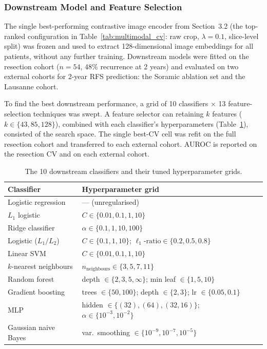 \documentclass[12pt,twoside]{report}
\begin{document}
\subsubsection*{Downstream Model and Feature Selection}
The single best-performing contrastive image encoder from Section~3.2
(the top-ranked configuration in Table~\ref{tab:multimodal_cv}: raw crop, $\lambda=0.1$,
slice-level split) was frozen and used to extract 128-dimensional image embeddings for all
patients, without any further training. Downstream models were fitted on the resection cohort
($n=54$, 48\% recurrence at 2 years) and evaluated on two external
cohorts for 2-year RFS prediction: the Soramic ablation set and the Lausanne cohort.


To find the best downstream performance, a grid of 10 classifiers
$\times$ 13 feature-selection techniques was swept. A feature selector can retaining $k$ features 
($k \in \{43, 85, 128\}$), combined with each classifier's hyperparameters (Table~\ref{tab:classifiere_hyperparameters}),
consisted of the search space. The single best-CV cell was refit on the full resection cohort and transferred to each
external cohort. AUROC is reported on the resection CV and on each external cohort.

\begin{table}[H]
\centering
\small
\caption{The 10 downstream classifiers and their tuned hyperparameter grids.}

\label{tab:classifiere_hyperparameters}
\begin{tabular}{lll}
\hline
Classifier & Hyperparameter grid \\
\hline
Logistic regression      & --- (unregularised) \\
$L_1$ logistic           & $C \in \{0.01, 0.1, 1, 10\}$ \\
Ridge classifier         & $\alpha \in \{0.1, 1, 10, 100\}$ \\
Logistic ($L_1/L_2$)     & $C \in \{0.1, 1, 10\}$; $\ell_1\text{-ratio} \in \{0.2, 0.5, 0.8\}$ \\
Linear SVM               & $C \in \{0.01, 0.1, 1, 10\}$ \\
$k$-nearest neighbours   & $n_{\text{neighbours}} \in \{3, 5, 7, 11\}$ \\
Random forest            & depth $\in \{2, 3, 5, \infty\}$; min leaf $\in \{1, 5, 10\}$ \\
Gradient boosting        & trees $\in \{50, 100\}$; depth $\in \{2, 3\}$; lr $\in \{0.05, 0.1\}$ \\
MLP                      & hidden $\in \{(32), (64), (32,16)\}$; $\alpha \in \{10^{-3}, 10^{-2}\}$ \\
Gaussian naive Bayes     & var.\ smoothing $\in \{10^{-9}, 10^{-7}, 10^{-5}\}$ \\
\hline
\end{tabular}
\end{table}
\end{document}
